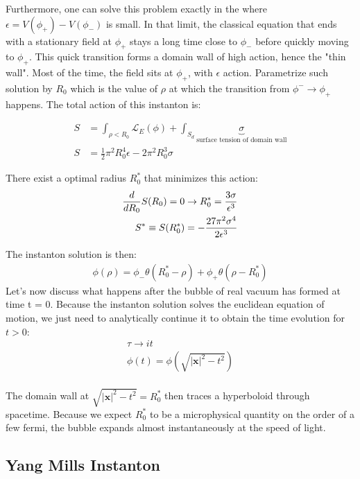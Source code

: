 \documentclass[11pt]{scrartcl}
\begin{document}
Furthermore, one can solve this problem exactly in the  where $\epsilon = V(\phi_+)- V(\phi_-)$ is small.   In that limit, the classical equation that ends with a stationary field at $\phi_+$ stays a long time close to $\phi_-$ before quickly moving to $\phi_+$.  This quick transition forms a domain wall of high action, hence the "thin wall".  Most of the time, the field sits at $\phi_+$, with $\epsilon$ action.  Parametrize such solution by $R_0$ which is the value of $\rho$ at which the transition from $\phi^- \rightarrow \phi_+$ happens.  The total action of this instanton is:

\begin{align}
	S & = \int_{\rho < R_0} \mathcal{L}_E (\phi) + \int_{S_d} \underbrace{\sigma}_{\text{surface tension of domain wall}} \\
	S &= {\frac12 \pi^2 R_0^4  \epsilon}  - 2 \pi^2 R_0^3 \sigma
	\end{align}

There exist a optimal radius $R_0^*$ that minimizes this action:
\begin{align}
	{d \over d R_0} S(R_0) = 0 \rightarrow R_0^* = {3 \sigma \over \epsilon^3} \\
	S^* \equiv S(R_0^*) = -{27 \pi^2 \sigma^4 \over 2 \epsilon^3}
	\end{align}

The instanton solution is then:
\begin{align}
	\phi(\rho) = \phi_- \theta(R_0^* - \rho) + \phi_+ \theta(\rho - R_0^*)
	\end{align}
Let's now discuss what happens after the bubble of real vacuum has formed at time t = 0.  Because the instanton solution solves the euclidean equation of motion, we just need to analytically continue it to obtain the time evolution for $t > 0$:
\begin{align}
	\tau \rightarrow it \\
	\phi(t) = \phi(\sqrt{|\mathbf{x}|^2 - t^2}) \\
	\end{align}

The domain wall at $\sqrt{|\mathbf{x}|^2 - t^2} = R_0^*$ then traces a hyperboloid through spacetime.  Because we expect $R_0^*$ to be a microphysical quantity on the order of a few fermi, the bubble expands almost instantaneously at the speed of light.

\subsection{Yang Mills Instanton}
\end{document}
